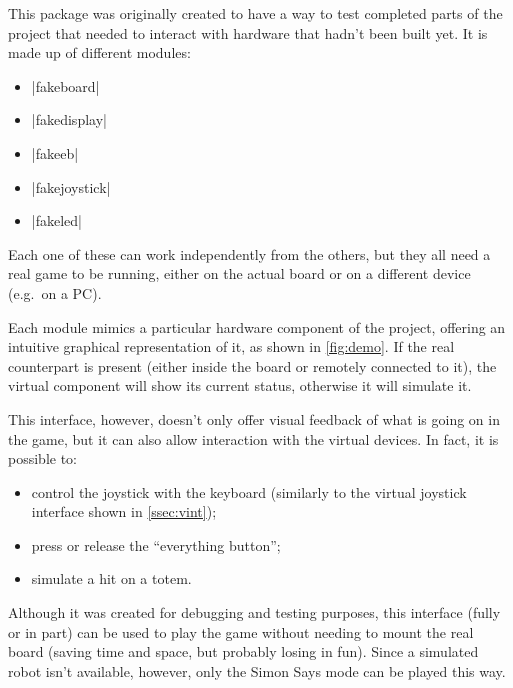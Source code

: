 \beforelist* This package was originally created to have a way to test completed
parts of the project that needed to interact with hardware that hadn't been
built yet.
It is made up of different modules:
\begin{multicols}{2}
\begin{itemize}
  \item \Code|fakeboard|
  \item \Code|fakedisplay|
  \item \Code|fakeeb|
  \item \Code|fakejoystick|
  \item \Code|fakeled|
\end{itemize}
\end{multicols}
\afterlist
Each one of these can work independently from the others, but they all need a
real game to be running, either on the actual board or on a different device
(e.g.\ on a PC).

Each module mimics a particular hardware component of the project, offering an
intuitive graphical representation of it, as shown in \autoref{fig:demo}. If the
real counterpart is present (either inside the board or remotely connected to
it), the virtual component will show its current status, otherwise it will
simulate it.

\beforelist* This interface, however, doesn't only offer visual feedback of what
is going on in the game, but it can also allow interaction with the virtual
devices.
In fact, it is possible to:
\begin{itemize}
  \item control the joystick with the keyboard (similarly to the virtual
    joystick interface shown in \autoref{ssec:vint});
  \item press or release the \textquotedblleft{}everything button\textquotedblright{};
  \item simulate a hit on a totem.
\end{itemize}
\afterlist*
Although it was created for debugging and testing purposes, this interface
(fully or in part) can be used to play the game without needing to mount the
real board (saving time and space, but probably losing in fun).
Since a simulated robot isn't available, however, only the Simon Says mode can
be played this way.

